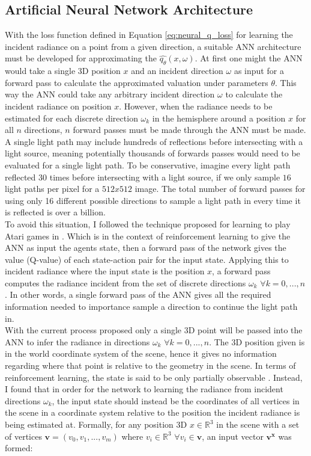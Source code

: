 \documentclass[../dissertation.tex]{subfiles}
\begin{document}
\subsection{Artificial Neural Network Architecture}
\label{sec:ann_architecture}

With the loss function defined in Equation \ref{eq:neural_q_loss} for learning the incident radiance on a point from a given direction, a suitable ANN architecture must be developed for approximating the $\hat{q_\theta}(x,\omega)$. At first one might the ANN would take a single 3D position $x$ and an incident direction $\omega$ as input for a forward pass to calculate the approximated valuation under parameters $\theta$. This way the ANN could take any arbitrary incident direction $\omega$ to calculate the incident radiance on position $x$. However, when the radiance needs to be estimated for each discrete direction $\omega_k$ in the hemisphere around a position $x$ for all $n$ directions, $n$ forward passes must be made through the ANN must be made. A single light path may include hundreds of reflections before intersecting with a light source, meaning potentially thousands of forwards passes would need to be evaluated for a single light path. To be conservative, imagine every light path reflected 30 times before intersecting with a light source, if we only sample $16$ light paths per pixel for a $512x512$ image. The total number of forward passes for using only 16 different possible directions to sample a light path in every time it is reflected is over a billion.\\

To avoid this situation, I followed the technique proposed for learning to play Atari games in \cite{mnih2013playing}. Which is in the context of reinforcement learning to give the ANN as input the agents state, then a forward pass of the network gives the value (Q-value) of each state-action pair for the input state. Applying this to incident radiance where the input state is the position $x$, a forward pass computes the radiance incident from the set of discrete directions $\omega_k$ $\forall k = 0, ..., n$.  In other words, a single forward pass of the ANN gives all the required information needed to importance sample a direction to continue the light path in.\\

With the current process proposed only a single 3D point will be passed into the ANN to infer the radiance in directions $\omega_k$ $\forall k = 0, ..., n$. The 3D position given is in the world coordinate system of the scene, hence it gives no information regarding where that point is relative to the geometry in the scene. In terms of reinforcement learning, the state is said to be only partially observable \cite{sutton2011reinforcement}. Instead, I found that in order for the network to learning the  radiance from incident directions $\omega_k$, the input state should instead be the coordinates of all vertices in the scene in a coordinate system relative to the position the incident radiance is being estimated at. Formally, for any position 3D $x \in \mathbb{R}^3$ in the scene with a set of vertices $\mathbf{v} = (v_0, v_1, ..., v_m)$ where $v_i \in \mathbb{R}^3$ $\forall v_i \in \mathbf{v}$, an input vector $\mathbf{v^x}$ was formed:
\end{document}
